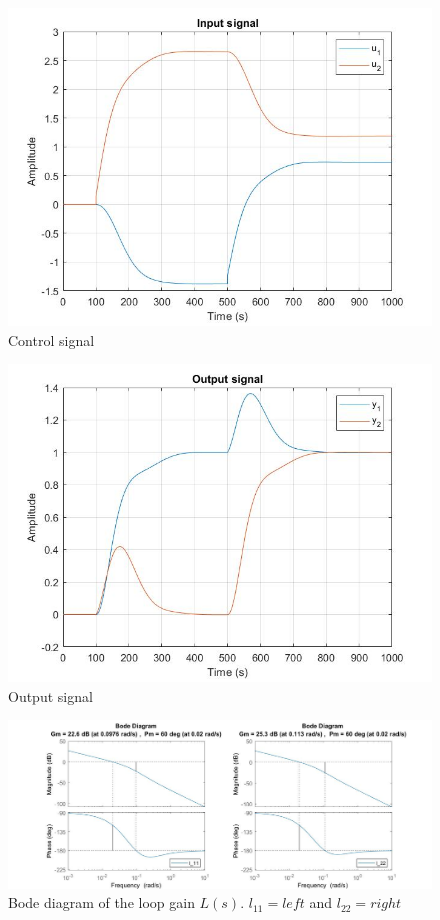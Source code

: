 \documentclass[a4paper,11pt]{article}
\begin{document}
	\begin{figure}[H]
        \centering
        \includegraphics[width=0.8\linewidth]{nonminphase_simulink_u.jpg}
        \caption{Control signal}
        \label{f4}
    \end{figure}
    \begin{figure}[H]
        \centering
        \includegraphics[width=0.8\linewidth]{nonminphase_simulink_y.jpg}
        \caption{Output signal}
        \label{f5}
    \end{figure}
    \begin{figure}[H]
        \centering
        \includegraphics[width=1\linewidth]{nonminphase_L.jpg}
        \caption{Bode diagram of the loop gain $L(s)$. $l_{11}= left$ and $l_{22}=right$}
        \label{f6}
    \end{figure}
\end{document}
